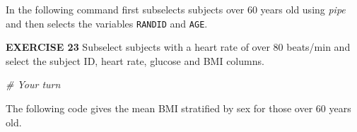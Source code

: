 \documentclass[
]{article}
\newenvironment{Shaded}{\begin{snugshade}}{\end{snugshade}}
\newcommand{\CommentTok}[1]{\textcolor[rgb]{0.56,0.35,0.01}{\textit{#1}}}
\newcommand{\DataTypeTok}[1]{\textcolor[rgb]{0.13,0.29,0.53}{#1}}
\newcommand{\DecValTok}[1]{\textcolor[rgb]{0.00,0.00,0.81}{#1}}
\newcommand{\KeywordTok}[1]{\textcolor[rgb]{0.13,0.29,0.53}{\textbf{#1}}}
\newcommand{\NormalTok}[1]{#1}
\newcommand{\OperatorTok}[1]{\textcolor[rgb]{0.81,0.36,0.00}{\textbf{#1}}}
\newcommand{\OtherTok}[1]{\textcolor[rgb]{0.56,0.35,0.01}{#1}}
\newcommand{\StringTok}[1]{\textcolor[rgb]{0.31,0.60,0.02}{#1}}
\begin{document}
In the following command first subselects subjects over 60 years old
using \emph{pipe} and then selects the variables \texttt{RANDID} and
\texttt{AGE}.

\begin{Shaded}
\end{Shaded}

\textbf{EXERCISE 23} Subselect subjects with a heart rate of over 80
beats/min and select the subject ID, heart rate, glucose and BMI
columns.

\begin{Shaded}
\begin{Highlighting}[]
\CommentTok{# Your turn}
\end{Highlighting}
\end{Shaded}

The following code gives the mean BMI stratified by sex for those over
60 years old.

\begin{Shaded}
\end{Shaded}
\end{document}
